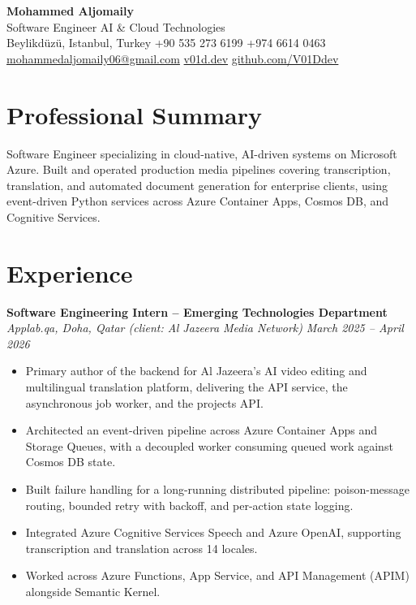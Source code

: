 \documentclass[10pt,a4paper]{article}
\begin{document}
\begin{center}
    {\LARGE \textbf{Mohammed Aljomaily}}\\[5pt]
    Software Engineer \textbar{} AI \& Cloud Technologies\\[5pt]
    Beylikd\"uz\"u, Istanbul, Turkey \textbar{} +90 535 273 6199 \textbar{} +974 6614 0463\\[3pt]
    \href{mailto:mohammedaljomaily06@gmail.com}{mohammedaljomaily06@gmail.com} \textbar{} \href{https://v01d.dev}{v01d.dev} \textbar{} \href{https://github.com/V01Ddev}{github.com/V01Ddev}
\end{center}

\section*{Professional Summary}
Software Engineer specializing in cloud-native, AI-driven systems on Microsoft
Azure. Built and operated production media pipelines covering transcription,
translation, and automated document generation for enterprise clients, using
event-driven Python services across Azure Container Apps, Cosmos DB, and
Cognitive Services.

\section*{Experience}
\textbf{Software Engineering Intern -- Emerging Technologies Department}\\
\textit{Applab.qa, Doha, Qatar (client: Al Jazeera Media Network)} \hfill \textit{March 2025 -- April 2026}

\begin{itemize}
    \item Primary author of the backend for Al Jazeera's AI video editing and
    multilingual translation platform, delivering the API service, the
    asynchronous job worker, and the projects API.
    \item Architected an event-driven pipeline across Azure Container Apps and
    Storage Queues, with a decoupled worker consuming queued work against
    Cosmos DB state.
    \item Built failure handling for a long-running distributed pipeline:
    poison-message routing, bounded retry with backoff, and per-action state logging.
    \item Integrated Azure Cognitive Services Speech and Azure OpenAI, supporting
    transcription and translation across 14 locales.
    \item Worked across Azure Functions, App Service, and API Management (APIM)
    alongside Semantic Kernel.
\end{itemize}
\end{document}
